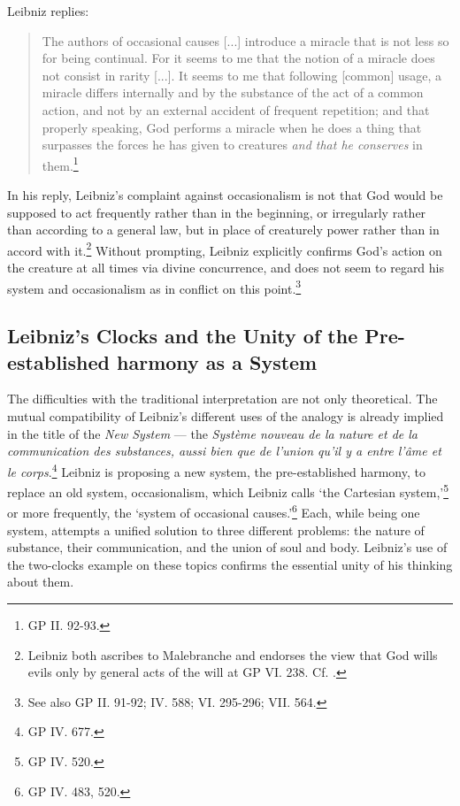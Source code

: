 \documentclass{article}
\begin{document}
Leibniz replies:

\begin{quote}
The authors of occasional causes {[}...{]} introduce a miracle that is
not less so for being continual. For it seems to me that the notion of a
miracle does not consist in rarity {[}...{]}. It seems to me that
following {[}common{]} usage, a miracle differs internally and by the
substance of the act of a common action, and not by an external accident
of frequent repetition; and that properly speaking, God performs a
miracle when he does a thing that surpasses the forces he has given to
creatures \emph{and that he conserves} in them.\footnote{GP II. 92-93.}
\end{quote}

In his reply, Leibniz's complaint against occasionalism is not that God
would be supposed to act frequently rather than in the beginning, or
irregularly rather than according to a general law, but in place of
creaturely power rather than in accord with it.\footnote{Leibniz both
  ascribes to Malebranche and endorses the view that God wills evils
  only by general acts of the will at GP VI. 238. Cf. \autocite{Schmaltz2010}.}
Without prompting, Leibniz explicitly confirms God's action on the
creature at all times via divine concurrence, and does not seem to
regard his system and occasionalism as in conflict on this
point.\footnote{See also GP II. 91-92; IV. 588; VI. 295-296; VII. 564.}

\subsection{Leibniz's Clocks and the Unity of the Pre-established
harmony as a
System}

The difficulties with the traditional interpretation are not only
theoretical. The mutual compatibility of Leibniz's different uses of the
analogy is already implied in the title of the \emph{New System} --- the
\emph{Système nouveau de la nature et de la communication des
substances, aussi bien que de l'union qu'il y a entre l'âme et le
corps}.\footnote{GP IV. 677.} Leibniz is proposing a new system, the
pre-established harmony, to replace an old system, occasionalism, which
Leibniz calls `the Cartesian system,'\footnote{GP IV. 520.} or more
frequently, the `system of occasional causes.'\footnote{GP IV. 483, 520.}
Each, while being one system, attempts a unified solution to three
different problems: the nature of substance, their communication, and
the union of soul and body. Leibniz's use of the two-clocks example on
these topics confirms the essential unity of his thinking about them.
\end{document}
